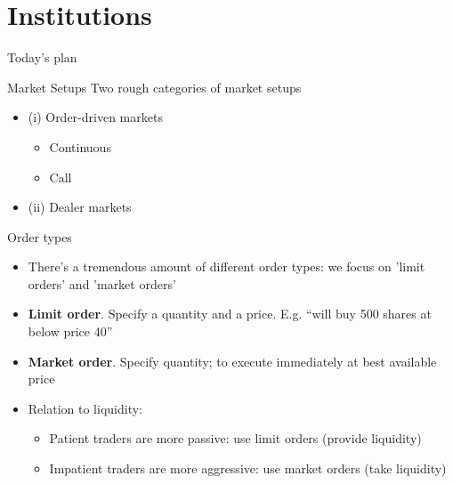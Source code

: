 \section{Institutions}

\begin{frame}{Today's plan}
\tableofcontents[currentsection]
\end{frame}




\begin{frame}{Market Setups}
Two rough categories of market setups
\begin{itemize}
	\item (i) Order-driven markets
	\begin{itemize}
		\item Continuous
		\item Call
	\end{itemize}
	\item (ii) Dealer markets
\end{itemize}
\end{frame}


\begin{frame}{Order types}
\begin{itemize}
	\item There's a tremendous amount of different order types: we focus on 'limit orders' and 'market orders'
	\item \textbf{Limit order}. Specify a quantity and a price. E.g. ``will buy 500 shares at below price 40''
	\item \textbf{Market order}. Specify quantity; to execute immediately at best available price
	\item Relation to liquidity:
	\begin{itemize}
		\item Patient traders are more passive: use limit orders (provide liquidity)
		\item Impatient traders are more aggressive: use market orders (take liquidity)
	\end{itemize}
\end{itemize}
\end{frame}


